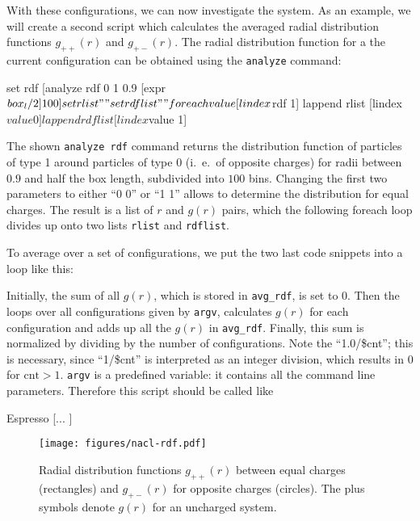 With these configurations, we can now investigate the system. As an example, we
will create a second script which calculates the averaged radial distribution
functions $g_{++}(r)$ and $g_{+-}(r)$. The radial distribution function for a
the current configuration can be obtained using the \verb|analyze| command:
\begin{tclcode}
set rdf [analyze rdf 0 1 0.9 [expr $box_l/2] 100]
set rlist ""
set rdflist ""
foreach value [lindex $rdf 1] {
  lappend rlist   [lindex $value 0]
  lappend rdflist [lindex $value 1] 
}
\end{tclcode}
The shown \verb|analyze rdf| command returns the distribution function of
particles of type 1 around particles of type 0 (i.~e.\ of opposite charges) for
radii between $0.9$ and half the box length, subdivided into $100$ bins.
Changing the first two parameters to either ``0 0'' or ``1 1'' allows to
determine the distribution for equal charges. The result is a list of $r$ and
$g(r)$ pairs, which the following foreach loop divides up onto two lists
\verb|rlist| and \verb|rdflist|.

To average over a set of configurations, we put the two last code snippets into
a loop like this:
Initially, the sum of all $g(r)$, which is stored in \verb|avg_rdf|, is set to
0.  Then the loops over all configurations given by \verb|argv|, calculates
$g(r)$ for each configuration and adds up all the $g(r)$ in \verb|avg_rdf|.
Finally, this sum is normalized by dividing by the number of
configurations. Note the ``1.0/\$cnt''; this is necessary, since ``1/\$cnt'' is
interpreted as an integer division, which results in 0 for $\text{cnt}>1$.
\verb|argv| is a predefined variable: it contains all the command line
parameters. Therefore this script should be called like
\begin{code}
Espresso  [... ]
\end{code}


\begin{figure}[tb]
  \centering
  \texttt{[image: figures/nacl-rdf.pdf]}
  \caption{Radial distribution functions $g_{++}(r)$ between equal charges
    (rectangles) and $g_{+-}(r)$ for opposite charges (circles). The plus
    symbols denote $g(r)$ for an uncharged system.}
  \label{fig:rdf}
\end{figure}

